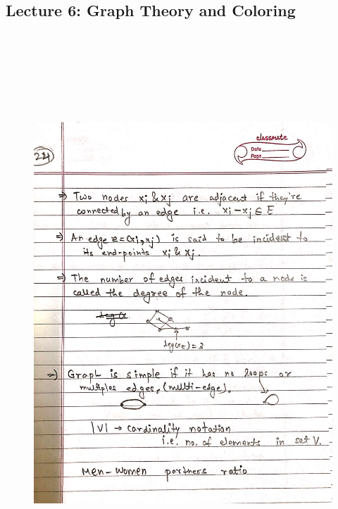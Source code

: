 \newpage
{\color{black} \subsection*{Lecture 6: Graph Theory and Coloring}}
\begin{figure}[H]
    \centering
    \includegraphics[width=16cm, height=21cm]{"./MIT-6.042J/MIT-6042J-024"}
\end{figure}

